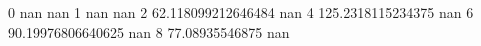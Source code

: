0 nan nan
1 nan nan
2 62.118099212646484 nan
4 125.2318115234375 nan
6 90.19976806640625 nan
8 77.08935546875 nan
